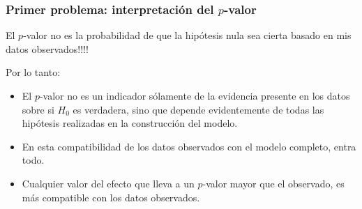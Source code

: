 \documentclass[9pt]{beamer}
\begin{document}
\begin{frame}
  \frametitle{Primer problema: interpretación del $p$-valor}
    \begin{overlayarea}{\textwidth}{0.8\textheight}
El $p$-valor no es la probabilidad de que la hipótesis nula sea cierta
basado en mis datos observados!!!!

\begin{center}
\end{center}

Por lo tanto:
\begin{itemize}
\item<5-> El $p$-valor no es un indicador sólamente de la evidencia presente en
los datos sobre si $H_0$ es verdadera, sino que depende evidentemente
de todas las hipótesis realizadas en la construcción del
modelo.
\item<6-> En esta compatibilidad de los datos observados con el modelo
  completo, entra todo.
\item<7-> Cualquier valor del efecto que lleva a un $p$-valor mayor
  que el observado, es más compatible con los datos observados. 
\end{itemize}

\end{overlayarea}
\end{frame}
\end{document}
